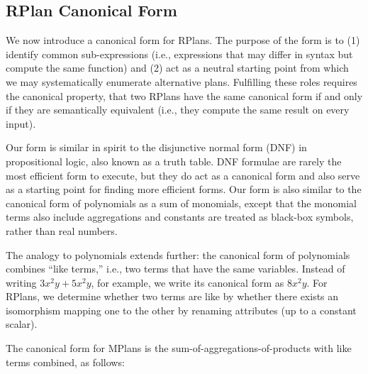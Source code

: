 \subsection{RPlan Canonical Form}
We now introduce a canonical form for RPlans.
The purpose of the form is to (1) identify common sub-expressions (i.e., expressions that may differ in syntax but compute the same function) and (2) act as a neutral starting point from which we may systematically enumerate alternative plans.  Fulfilling these roles requires the canonical property, that two RPlans have the same canonical form if and only if they are semantically equivalent (i.e., they compute the same result on every input).%

Our form is similar in spirit to the disjunctive normal form (DNF) in propositional logic, also known as a truth table.  DNF formulae are rarely the most efficient form to execute, but they do act as a canonical form and also serve as a starting point for finding more efficient forms.  %
Our form is also similar to the canonical form of polynomials as a sum of monomials, except that the monomial terms also include aggregations and constants are treated as black-box symbols, rather than real numbers.

The analogy to polynomials extends further: the canonical form of polynomials combines ``like terms,'' i.e., two terms that have the same variables.  Instead of writing $3x^2y + 5x^2y$, for example, we write its canonical form as $8x^2y$.
For RPlans, we determine whether two terms are like by whether there exists an isomorphism mapping one to the other by renaming attributes (up to a constant scalar).

The canonical form for MPlans is the sum-of-aggregations-of-products with like terms combined, as follows:

